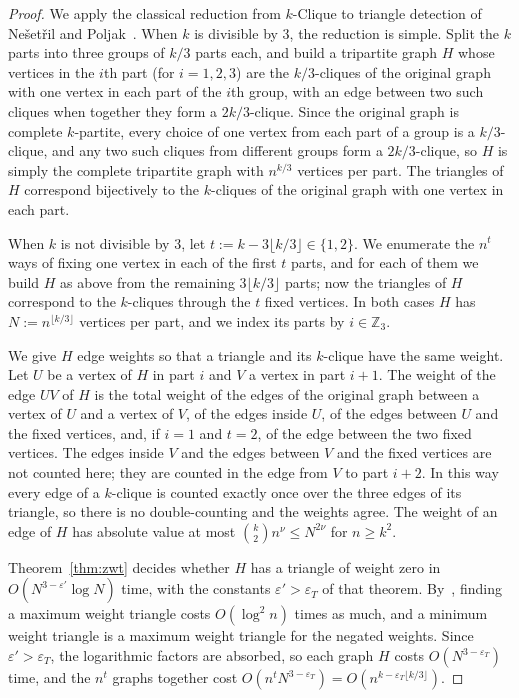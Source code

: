 \begin{proof}
We apply the classical reduction from $k$-Clique to triangle detection of Ne\v{s}et\v{r}il and Poljak~\cite{NP85}. When $k$ is divisible by $3$, the reduction is simple. Split the $k$ parts into three groups of $k/3$ parts each, and build a tripartite graph $H$ whose vertices in the $i$th part (for $i=1,2,3$) are the $k/3$-cliques of the original graph with one vertex in each part of the $i$th group, with an edge between two such cliques when together they form a $2k/3$-clique. Since the original graph is complete $k$-partite, every choice of one vertex from each part of a group is a $k/3$-clique, and any two such cliques from different groups form a $2k/3$-clique, so $H$ is simply the complete tripartite graph with $n^{k/3}$ vertices per part. The triangles of $H$ correspond bijectively to the $k$-cliques of the original graph with one vertex in each part.

When $k$ is not divisible by $3$, let $t:=k-3\lfloor k/3\rfloor\in\{1,2\}$. We enumerate the $n^t$ ways of fixing one vertex in each of the first $t$ parts, and for each of them we build $H$ as above from the remaining $3\lfloor k/3\rfloor$ parts; now the triangles of $H$ correspond to the $k$-cliques through the $t$ fixed vertices. In both cases $H$ has $N:=n^{\lfloor k/3\rfloor}$ vertices per part, and we index its parts by $i\in\mathbb Z_3$.

We give $H$ edge weights so that a triangle and its $k$-clique have the same weight. Let $U$ be a vertex of $H$ in part $i$ and $V$ a vertex in part $i+1$. The weight of the edge $UV$ of $H$ is the total weight of the edges of the original graph between a vertex of $U$ and a vertex of $V$, of the edges inside $U$, of the edges between $U$ and the fixed vertices, and, if $i=1$ and $t=2$, of the edge between the two fixed vertices. The edges inside $V$ and the edges between $V$ and the fixed vertices are not counted here; they are counted in the edge from $V$ to part $i+2$. In this way every edge of a $k$-clique is counted exactly once over the three edges of its triangle, so there is no double-counting and the weights agree. The weight of an edge of $H$ has absolute value at most $\binom k2n^\nu\le N^{2\nu}$ for $n\ge k^2$.

Theorem~\ref{thm:zwt} decides whether $H$ has a triangle of weight zero in $O(N^{3-\varepsilon'}\log N)$ time, with the constants $\varepsilon'>\varepsilon_T$ of that theorem. By~\cite[Theorem~3.3]{VW13}, finding a maximum weight triangle costs $O(\log^2n)$ times as much, and a minimum weight triangle is a maximum weight triangle for the negated weights. Since $\varepsilon'>\varepsilon_T$, the logarithmic factors are absorbed, so each graph $H$ costs $O(N^{3-\varepsilon_T})$ time, and the $n^t$ graphs together cost $O(n^tN^{3-\varepsilon_T})=O(n^{k-\varepsilon_T\lfloor k/3\rfloor})$.
\end{proof}

